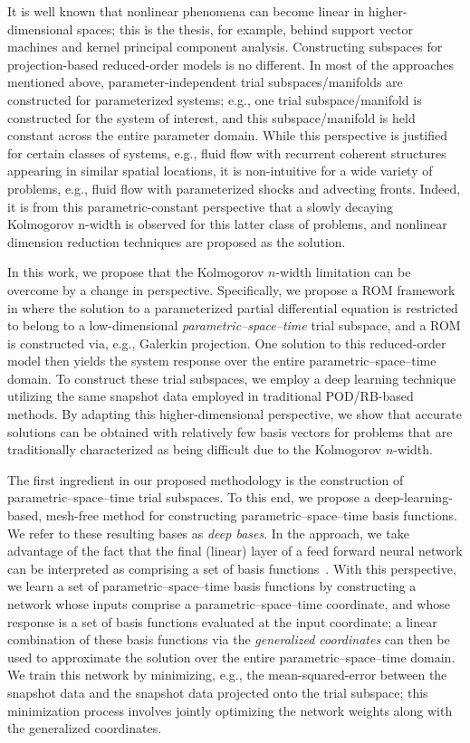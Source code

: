 \documentclass[3p,computermodern,10pt]{elsarticle}
\begin{document}
It is well known that nonlinear phenomena can become linear in higher-dimensional spaces; this is the thesis, for example, behind support vector machines and kernel principal component analysis. Constructing subspaces for projection-based reduced-order models is no different. In most of the approaches mentioned above, parameter-independent trial subspaces/manifolds are constructed for parameterized systems; e.g., one trial subspace/manifold is constructed for the system of interest, and this subspace/manifold is held constant across the entire parameter domain. While this perspective is justified for certain classes of systems, e.g., fluid flow with recurrent coherent structures appearing in similar spatial locations, it is non-intuitive for a wide variety of problems, e.g., fluid flow with parameterized shocks and advecting fronts.  Indeed, it is from this parametric-constant perspective that a slowly decaying Kolmogorov n-width is observed for this latter class of problems, and nonlinear dimension reduction techniques are proposed as the solution.

In this work, we propose that the Kolmogorov $n$-width limitation can be overcome by a change in perspective. Specifically, we propose a ROM framework in where the solution to a parameterized partial differential equation is restricted to belong to a low-dimensional \textit{parametric--space--time} trial subspace, and a ROM is constructed via, e.g., Galerkin projection.  One solution to this reduced-order model then yields the system response over the entire parametric--space--time domain. To construct these trial subspaces, we employ a deep learning technique utilizing the same snapshot data employed in traditional POD/RB-based methods. By adapting this higher-dimensional perspective, we show that accurate solutions can be obtained with relatively few basis vectors for problems that are traditionally characterized as being difficult due to the Kolmogorov $n$-width. 

The first ingredient in our proposed methodology is the construction of parametric--space--time trial subspaces. To this end, we propose a deep-learning-based, mesh-free method for constructing parametric--space--time basis functions. We refer to these resulting bases as \textit{deep bases}. In the approach, we take advantage of the fact that the final (linear) layer of a feed forward neural network can be interpreted as comprising a set of basis functions~\cite{CyGuPa20}. With this perspective, we learn a set of parametric--space--time basis functions by constructing a network whose inputs comprise a parametric--space--time coordinate, and whose response is a set of basis functions evaluated at the input coordinate; a linear combination of these basis functions via the \textit{generalized coordinates} can then be used to approximate the solution over the entire parametric--space--time domain. We train this network by minimizing, e.g., the mean-squared-error between the snapshot data and the snapshot data projected onto the trial subspace; this minimization process involves jointly optimizing the network weights along with the generalized coordinates.
\end{document}
